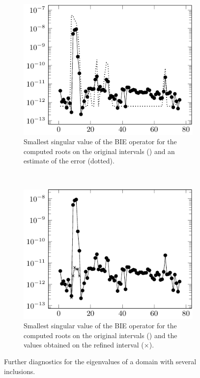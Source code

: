 %

\begin{figure}
  \centering
  \begin{subfigure}[t]{0.4\textwidth}
    \centering
    \includegraphics[width=\textwidth]{fig/ex_many_holes_004_sings_plot_west}
    \caption{Smallest singular value of the BIE operator
      for the computed roots on the original intervals (\textbullet)
      and an estimate of the error (dotted).}
    \label{subfig:many_inclusions_sings_west}
  \end{subfigure}
  ~
  \begin{subfigure}[t]{0.4\textwidth}
    \centering
    \includegraphics[width=\textwidth]{fig/ex_many_holes_004_sings_plot_ref}
    \caption{Smallest singular value of the BIE operator
      for the computed roots on the original intervals (\textbullet)
      and the values obtained on the refined interval ($\times$).}
    \label{subfig:many_inclusions_sings_ref}
  \end{subfigure}
  \caption{Further diagnostics for the eigenvalues of a domain
    with several inclusions.}
  \label{fig:many_inclusions_diagnostics_2}
\end{figure}

